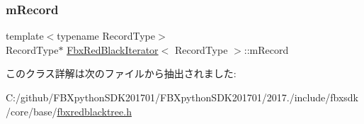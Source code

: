 \subsubsection{\texorpdfstring{m\+Record}{mRecord}}
{\footnotesize\ttfamily template$<$typename Record\+Type$>$ \\
Record\+Type$\ast$ \hyperlink{class_fbx_red_black_iterator}{Fbx\+Red\+Black\+Iterator}$<$ Record\+Type $>$\+::m\+Record\hspace{0.3cm}{\ttfamily [protected]}}



このクラス詳解は次のファイルから抽出されました\+:\begin{DoxyCompactItemize}
\item 
C\+:/github/\+F\+B\+Xpython\+S\+D\+K201701/\+F\+B\+Xpython\+S\+D\+K201701/2017./include/fbxsdk/core/base/\hyperlink{fbxredblacktree_8h}{fbxredblacktree.\+h}\end{DoxyCompactItemize}
